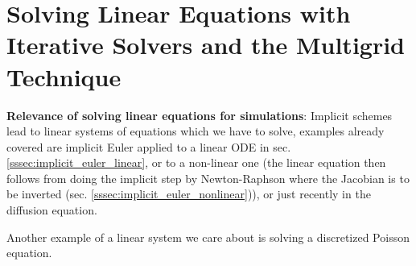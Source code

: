 \section{Solving Linear Equations with Iterative Solvers and the Multigrid Technique}
\thispagestyle{plain}

\textbf{Relevance of solving linear equations for simulations}: Implicit schemes lead to linear systems of equations which we have to solve,
examples already covered are implicit Euler applied to a linear ODE in sec. \ref{sssec:implicit_euler_linear},
or to a non-linear one (the linear equation then follows from doing the implicit step
by Newton-Raphson where the Jacobian is to be inverted (sec. \ref{sssec:implicit_euler_nonlinear})),
or just recently in the diffusion equation.

Another example of a linear system we care about is solving a discretized Poisson equation.



